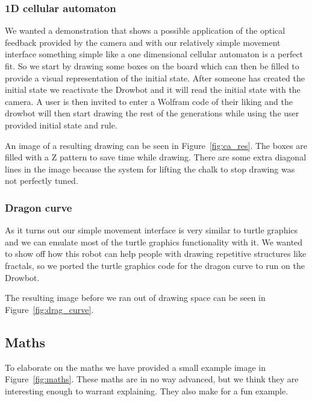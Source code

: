 \documentclass[12pt]{article}
\begin{document}
\subsubsection*{1D cellular automaton}

We wanted a demonstration that shows a possible application of the
optical feedback provided by the camera and with our relatively
simple movement interface something simple like a one dimensional
cellular automaton is a perfect fit.
So we start by drawing some boxes on the board which can then be
filled to provide a visual representation of the initial state.
After someone has created the initial state we reactivate the
Drowbot and it will read the initial state with the camera.
A user is then invited to enter a Wolfram code of their liking
and the drowbot will then start drawing the rest of the generations
while using the user provided initial state and rule.

An image of a resulting drawing can be seen in Figure~\ref{fig:ca_res}.
The boxes are filled with a Z pattern to save time while drawing.
There are some extra diagonal lines in the image because the system
for lifting the chalk to stop drawing was not perfectly tuned.

\subsubsection*{Dragon curve}

As it turns out our simple movement interface is very similar to
turtle graphics and we can emulate most of the turtle graphics
functionality with it.
We wanted to show off how this robot can help people with drawing
repetitive structures like fractals, so we ported the turtle
graphics code for the dragon curve to run on the Drowbot.

The resulting image before we ran out of drawing space can be
seen in Figure~\ref{fig:drag_curve}.


\subsection{Maths}

To elaborate on the maths we have provided a small example image
in Figure~\ref{fig:maths}.
These maths are in no way advanced, but we think they are interesting
enough to warrant explaining.
They also make for a fun example.
\end{document}
